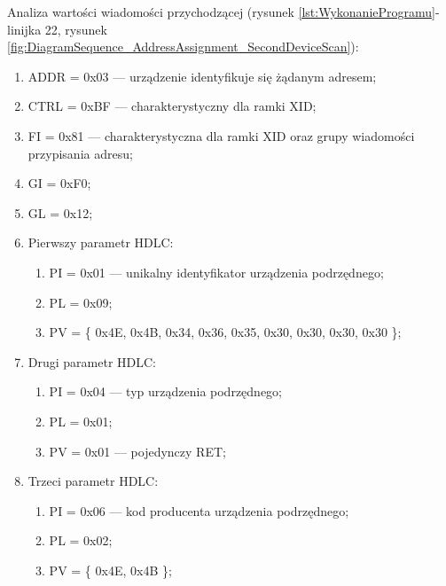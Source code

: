 \bigskip
Analiza wartości wiadomości przychodzącej 
(rysunek \ref{lst:WykonanieProgramu}- linijka 22, rysunek \ref{fig:DiagramSequence_AddressAssignment_SecondDeviceScan}):
\begin{enumerate}
    \item ADDR = 0x03 --- urządzenie identyfikuje się żądanym adresem;
    \item CTRL = 0xBF --- charakterystyczny dla ramki XID;
    \item FI = 0x81 --- charakterystyczna dla ramki XID oraz grupy wiadomości przypisania adresu;
    \item GI = 0xF0;
    \item GL = 0x12;
    \item Pierwszy parametr HDLC:
    \begin{enumerate}
        \item PI = 0x01 --- unikalny identyfikator urządzenia podrzędnego;
        \item PL = 0x09;
        \item PV = \{ 0x4E, 0x4B, 0x34, 0x36, 0x35, 0x30, 0x30, 0x30, 0x30 \};
    \end{enumerate}
    \item Drugi parametr HDLC:
    \begin{enumerate}
        \item PI = 0x04 --- typ urządzenia podrzędnego;
        \item PL = 0x01;
        \item PV = 0x01 --- pojedynczy RET;
    \end{enumerate}
    \item Trzeci parametr HDLC:
    \begin{enumerate}
        \item PI = 0x06 --- kod producenta urządzenia podrzędnego;
        \item PL = 0x02;
        \item PV = \{ 0x4E, 0x4B \};
    \end{enumerate}
\end{enumerate}

